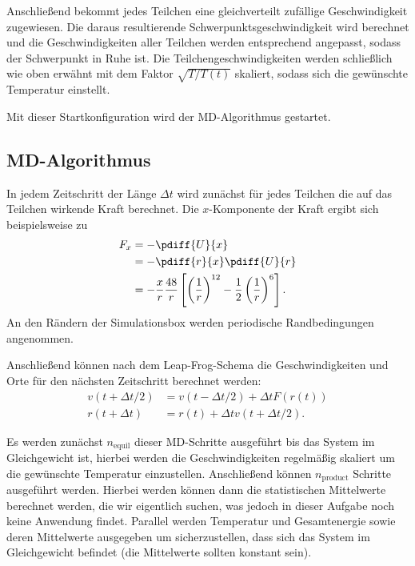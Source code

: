 \documentclass[11pt,a4paper]{article}
\newcommand{\ind}[1]{_{\mathrm{#1}}}
\begin{document}
Anschließend bekommt jedes Teilchen eine gleichverteilt zufällige Geschwindigkeit zugewiesen. Die daraus resultierende Schwerpunktsgeschwindigkeit wird berechnet und die Geschwindigkeiten aller Teilchen werden entsprechend angepasst, sodass der Schwerpunkt in Ruhe ist. Die Teilchengeschwindigkeiten werden schließlich wie oben erwähnt mit dem Faktor $\sqrt{ T/T(t)}$ skaliert, sodass sich die gewünschte Temperatur einstellt.

Mit dieser Startkonfiguration wird der MD-Algorithmus gestartet.

\subsection{MD-Algorithmus} %
\label{sub:md_algorithms}
In jedem Zeitschritt der Länge $\Delta t$ wird zunächst für jedes Teilchen die auf das Teilchen wirkende Kraft berechnet. Die $x$-Komponente der Kraft ergibt sich beispielsweise zu
\begin{align}
	F_x &= - \pdiff{U}{x} \\
		&= - \pdiff{r}{x} \pdiff{U}{r} \\
		&= - \frac{x}{r} \frac{48}{r} \left[ \left( \frac{1}{r}  \right)^{12} - \frac{1}{2} \left( \frac{1}{r}  \right)^6     \right]  .
\end{align}
An den Rändern der Simulationsbox werden periodische Randbedingungen angenommen.

Anschließend können nach dem Leap-Frog-Schema die Geschwindigkeiten und Orte für den nächsten Zeitschritt berechnet werden:
\begin{align}
	v(t+\Delta t/2) &= v(t-\Delta t/2) + \Delta t F(r(t))\\
	r(t+\Delta t) &= r(t) + \Delta t v(t+\Delta t/2).
\end{align}

Es werden zunächst $n\ind{equil}$ dieser MD-Schritte ausgeführt bis das System im Gleichgewicht ist, hierbei werden die Geschwindigkeiten regelmäßig skaliert um die gewünschte Temperatur einzustellen. Anschließend können $n\ind{product}$ Schritte ausgeführt werden. Hierbei werden können dann die statistischen Mittelwerte berechnet werden, die wir eigentlich suchen, was jedoch in dieser Aufgabe noch keine Anwendung findet. Parallel werden Temperatur und Gesamtenergie sowie deren Mittelwerte ausgegeben um sicherzustellen, dass sich das System im Gleichgewicht befindet (die Mittelwerte sollten konstant sein).
\end{document}
